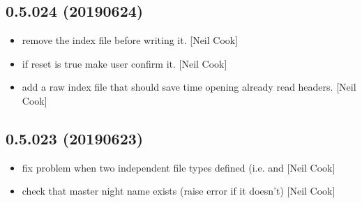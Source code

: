 \documentclass[a4paper,10pt,english]{report}
\begin{document}
\subsection{0.5.024 (2019\sphinxhyphen{}06\sphinxhyphen{}24)}
\label{\detokenize{misc/changelog:id131}}\begin{itemize}
\item {} 
 \sphinxhyphen{} remove the index file before writing it. {[}Neil Cook{]}

\item {} 
 \sphinxhyphen{} if reset is true make user confirm it. {[}Neil Cook{]}

\item {} 
 \sphinxhyphen{} add a raw index file that should save time opening
already read headers. {[}Neil Cook{]}

\end{itemize}


\subsection{0.5.023 (2019\sphinxhyphen{}06\sphinxhyphen{}23)}
\label{\detokenize{misc/changelog:id132}}\begin{itemize}
\item {} 
 \sphinxhyphen{} fix problem when two independent file types defined
(i.e.  and  {[}Neil Cook{]}

\item {} 
 \sphinxhyphen{} check that master night name exists (raise error if it
doesn’t) {[}Neil Cook{]}

\end{itemize}
\end{document}
